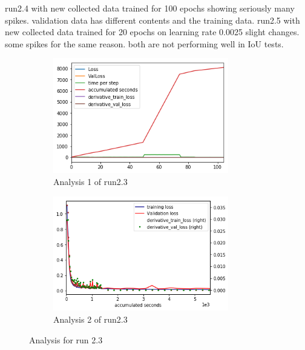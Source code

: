\documentclass[paper=a4, fontsize=11pt]{scrartcl} %
\numberwithin{equation}{section} %
\numberwithin{figure}{section} %
\numberwithin{table}{section} %
\begin{document}
run2.4 with new collected data trained for 100 epochs showing seriously many spikes. validation data has different contents and the training data. 
run2.5 with new collected data trained for 20 epochs on learning rate 0.0025 slight changes. some spikes for the same reason. 
both are not performing well in IoU tests.

\begin{figure}
   \begin{subfigure}{0.45\textwidth}
   \includegraphics[width=0.9\linewidth, height=5cm]{./imgs/analysis_0_2_3.png} 
   \caption{Analysis 1 of run2.3}
   \label{fig:subAnalysisRun23}
   \end{subfigure}
   \begin{subfigure}{0.45\textwidth}
   \includegraphics[width=0.9\linewidth, height=5cm]{./imgs/analysis_0_2_3plot.png}
   \caption{Analysis 2 of run2.3}
   \label{fig:subAnalysisRun23plot}
   \end{subfigure}
	
   \caption{Analysis for run 2.3}
   \label{fig:AnalysisRun23}
\end{figure}
\end{document}
